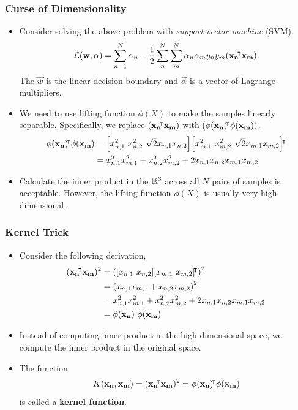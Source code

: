 \documentclass[10pt]{../formats/RU}
\begin{document}
\begin{frame}
\frametitle{Curse of Dimensionality}
\begin{itemize}
  \item<1-> Consider solving the above problem with \emph{support vector machine} (SVM).
  \begin{align*}
    \mathcal{L}(\mathbf{w}, \mathbf{\alpha}) = \sum_{n=1}^N\alpha_n - \frac{1}{2}\sum_{n}^{N}\sum_{m}^{N}\alpha_n\alpha_m y_ny_m(\mathbf{x_n}{}^{\mkern-4mu\intercal} \mathbf{x_m}).
  \end{align*}
  The $\vec{w}$ is the linear decision boundary and $\vec{\alpha}$ is a vector of Lagrange multipliers.
  \item <2-> We need to use lifting function $\phi(X)$ to make the samples linearly separable. Specifically, we replace $(\mathbf{x_n}{}^{\mkern-4mu\intercal} \mathbf{x_m})$ with $(\phi(\mathbf{x_n}){}^{\mkern-4mu\intercal}\phi(\mathbf{x_m}))$.
  \begin{align*}
    \phi(\mathbf{x_n})\trn\phi(\mathbf{x_m}) 
    &= \bracks*{x_{n,1}^2 \ x_{n,2}^2 \ \sqrt{2}x_{n,1}x_{n,2}}\bracks*{x_{m,1}^2 \ x_{m,2}^2 \ \sqrt{2}x_{m,1}x_{m,2}}\trn \\
    &= x_{n,1}^2x_{m,1}^2 + x_{n,2}^2x_{m,2}^2 + 2x_{n,1}x_{n,2}x_{m,1}x_{m,2}
  \end{align*}
  \item<3-> Calculate the inner product in the $\mathbb{R}^3$ across all $N$ pairs of samples is acceptable. However, the lifting function $\phi(X)$ is usually very high dimensional.
\end{itemize}
\end{frame}
\begin{frame}
  \frametitle{Kernel Trick}
  \begin{itemize}
    \item <1-> Consider the following derivation,
    \begin{align*}
      (\mathbf{x_n}\trn \mathbf{x_m})^2 
      &= \parens*{\bracks*{x_{n,1} \ x_{n,2}}\bracks*{x_{m,1} \ x_{m,2}}\trn}^2 \\
      &= \parens*{x_{n,1}x_{m,1} + x_{n,2}x_{m,2}}^2 \\
      &= x_{n,1}^2x_{m,1}^2 + x_{n,2}^2x_{m,2}^2 + 2x_{n,1}x_{n,2}x_{m,1}x_{m,2} \\
      &= \phi(\mathbf{x_n})\trn\phi(\mathbf{x_m})
    \end{align*}
    \item <2-> Instead of computing inner product in the high dimensional space, we compute the inner product in the original space.
    \item <3-> The function 
    \begin{align*}
      K(\mathbf{x_n}, \mathbf{x_m}) = (\mathbf{x_n}{}^{\mkern-4mu\intercal} \mathbf{x_m})^2 = \phi(\mathbf{x_n}){}^{\mkern-4mu\intercal}\phi(\mathbf{x_m})
    \end{align*}
     is called a \textbf{kernel function}.
  \end{itemize}
\end{frame}
\end{document}
